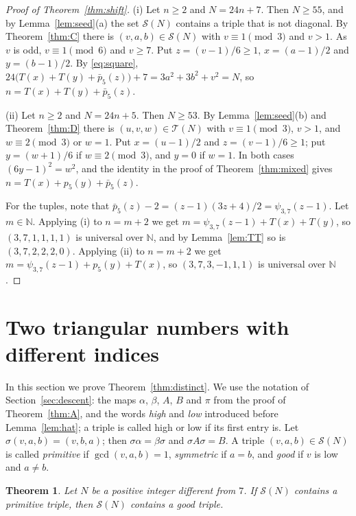 \documentclass[11pt]{amsart}
\newtheorem{theorem}{Theorem}[section]
\theoremstyle{definition}
\theoremstyle{remark}
\newcommand{\N}{\mathbb{N}}
\newcommand{\cS}{\mathcal{S}}
\newcommand{\cT}{\mathcal{T}}
\newcommand{\pb}{\bar p_5}
\newcommand{\Tr}{T}
\begin{document}
\begin{proof}[Proof of Theorem~\ref{thm:shift}]
(i) Let $n\ge 2$ and $N=24n+7$. Then $N\ge 55$, and by Lemma~\ref{lem:seed}(a) the set $\cS(N)$ contains a triple that is not diagonal.
By Theorem~\ref{thm:C} there is $(v,a,b)\in\cS(N)$ with $v\equiv 1\pmod 3$ and $v>1$. As $v$ is odd, $v\equiv 1\pmod 6$ and $v\ge 7$.
Put $z=(v-1)/6\ge 1$, $x=(a-1)/2$ and $y=(b-1)/2$. By \eqref{eq:square},
$24\bigl(\Tr(x)+\Tr(y)+\pb(z)\bigr)+7=3a^2+3b^2+v^2=N$, so $n=\Tr(x)+\Tr(y)+\pb(z)$.

(ii) Let $n\ge 2$ and $N=24n+5$. Then $N\ge 53$. By Lemma~\ref{lem:seed}(b) and Theorem~\ref{thm:D} there is $(u,v,w)\in\cT(N)$
with $v\equiv 1\pmod 3$, $v>1$, and $w\equiv 2\pmod 3$ or $w=1$. Put $x=(u-1)/2$ and $z=(v-1)/6\ge 1$; put $y=(w+1)/6$ if $w\equiv 2\pmod 3$, and $y=0$ if $w=1$.
In both cases $(6y-1)^2=w^2$, and the identity in the proof of Theorem~\ref{thm:mixed} gives $n=\Tr(x)+p_5(y)+\pb(z)$.

For the tuples, note that $\pb(z)-2=(z-1)(3z+4)/2=\psi_{3,7}(z-1)$. Let $m\in\N$. Applying (i) to $n=m+2$ we get
$m=\psi_{3,7}(z-1)+\Tr(x)+\Tr(y)$, so $(3,7,1,1,1,1)$ is universal over $\N$, and by Lemma~\ref{lem:TT} so is $(3,7,2,2,2,0)$.
Applying (ii) to $n=m+2$ we get $m=\psi_{3,7}(z-1)+p_5(y)+\Tr(x)$, so $(3,7,3,-1,1,1)$ is universal over $\N$.
\end{proof}

\section{Two triangular numbers with different indices}\label{sec:distinct}

In this section we prove Theorem~\ref{thm:distinct}. We use the notation of Section~\ref{sec:descent}:
the maps $\alpha$, $\beta$, $A$, $B$ and $\pi$ from the proof of Theorem~\ref{thm:A}, and the words \emph{high} and \emph{low} introduced before Lemma~\ref{lem:hat};
a triple is called high or low if its first entry is.
Let $\sigma(v,a,b)=(v,b,a)$; then $\sigma\alpha=\beta\sigma$ and $\sigma A\sigma=B$.
A triple $(v,a,b)\in\cS(N)$ is called \emph{primitive} if $\gcd(v,a,b)=1$, \emph{symmetric} if $a=b$, and \emph{good} if $v$ is low and $a\ne b$.

\begin{theorem}\label{thm:E}
Let $N$ be a positive integer different from $7$. If $\cS(N)$ contains a primitive triple, then $\cS(N)$ contains a good triple.
\end{theorem}
\end{document}
